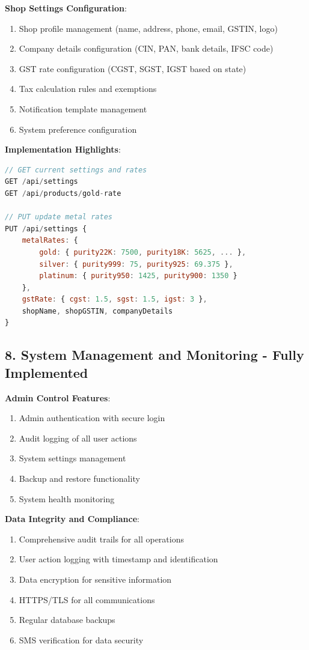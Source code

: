 \documentclass[12pt,a4paper]{report}
\begin{document}
\textbf{Shop Settings Configuration}:
\begin{enumerate}[label=\roman*)]
    \item Shop profile management (name, address, phone, email, GSTIN, logo)
    \item Company details configuration (CIN, PAN, bank details, IFSC code)
    \item GST rate configuration (CGST, SGST, IGST based on state)
    \item Tax calculation rules and exemptions
    \item Notification template management
    \item System preference configuration
\end{enumerate}

\textbf{Implementation Highlights}:
\begin{lstlisting}[language=JavaScript, caption=Gold Rate Settings API]
// GET current settings and rates
GET /api/settings
GET /api/products/gold-rate

// PUT update metal rates
PUT /api/settings {
    metalRates: {
        gold: { purity22K: 7500, purity18K: 5625, ... },
        silver: { purity999: 75, purity925: 69.375 },
        platinum: { purity950: 1425, purity900: 1350 }
    },
    gstRate: { cgst: 1.5, sgst: 1.5, igst: 3 },
    shopName, shopGSTIN, companyDetails
}
\end{lstlisting}

\subsection{8. System Management and Monitoring - Fully Implemented}

\textbf{Admin Control Features}:
\begin{enumerate}[label=\roman*)]
    \item Admin authentication with secure login
    \item Audit logging of all user actions
    \item System settings management
    \item Backup and restore functionality
    \item System health monitoring
\end{enumerate}

\textbf{Data Integrity and Compliance}:
\begin{enumerate}[label=\roman*)]
    \item Comprehensive audit trails for all operations
    \item User action logging with timestamp and identification
    \item Data encryption for sensitive information
    \item HTTPS/TLS for all communications
    \item Regular database backups
    \item SMS verification for data security
\end{enumerate}
\end{document}
